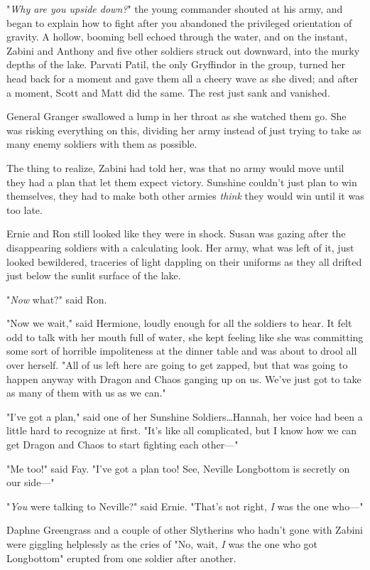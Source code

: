 "\emph{Why are you upside down?}" the young commander shouted at his army, and
began to explain how to fight after you abandoned the privileged orientation of
gravity.
\later
A hollow, booming bell echoed through the water, and on the instant, Zabini and
Anthony and five other soldiers struck out downward, into the murky depths of
the lake. Parvati Patil, the only Gryffindor in the group, turned her head back
for a moment and gave them all a cheery wave as she dived; and after a moment,
Scott and Matt did the same. The rest just sank and vanished.

General Granger swallowed a lump in her throat as she watched them go. She was
risking everything on this, dividing her army instead of just trying to take as
many enemy soldiers with them as possible.

The thing to realize, Zabini had told her, was that no army would move until
they had a plan that let them expect victory. Sunshine couldn't just plan to
win themselves, they had to make both other armies \emph{think} they would win
until it was too late.

Ernie and Ron still looked like they were in shock. Susan was gazing after the
disappearing soldiers with a calculating look. Her army, what was left of it,
just looked bewildered, traceries of light dappling on their uniforms as they
all drifted just below the sunlit surface of the lake.

"\emph{Now} what?" said Ron.

"Now we wait," said Hermione, loudly enough for all the soldiers to hear. It
felt odd to talk with her mouth full of water, she kept feeling like she was
committing some sort of horrible impoliteness at the dinner table and was about
to drool all over herself. "All of us left here are going to get zapped, but
that was going to happen anyway with Dragon and Chaos ganging up on us. We've
just got to take as many of them with us as we can."

"I've got a plan," said one of her Sunshine Soldiers…Hannah, her voice
had been a little hard to recognize at first. "It's like all complicated, but I
know how we can get Dragon and Chaos to start fighting each other---"

"Me too!" said Fay. "I've got a plan too! See, Neville Longbottom is secretly
on our side---"

"\emph{You} were talking to Neville?" said Ernie. "That's not right, \emph{I}
was the one who---"

Daphne Greengrass and a couple of other Slytherins who hadn't gone with Zabini
were giggling helplessly as the cries of "No, wait, \emph{I} was the one who
got Longbottom" erupted from one soldier after another.

